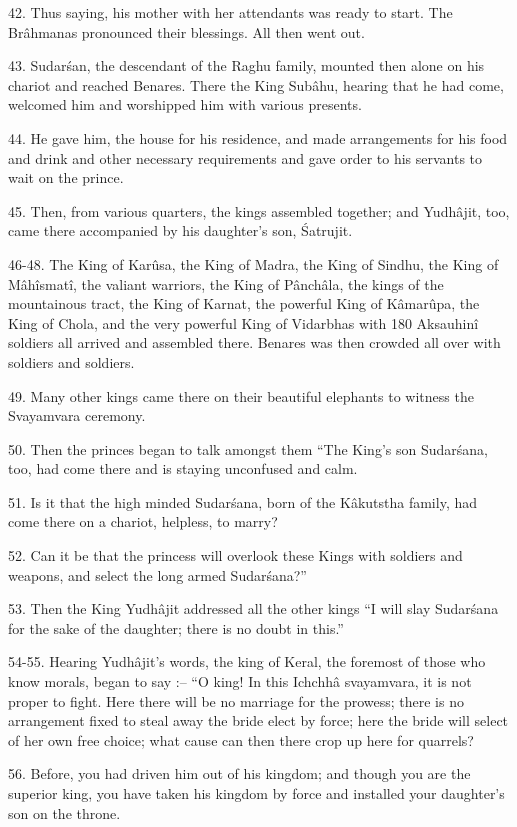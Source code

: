 42. Thus saying, his mother with her attendants was ready to start. The Br\^ahmanas pronounced their blessings. All then went out.

43. Sudar\'san, the descendant of the Raghu family, mounted then alone on his chariot and reached Benares. There the King Sub\^ahu, hearing that he had come, welcomed him and worshipped him with various presents.

44. He gave him, the house for his residence, and made arrangements for his food and drink and other necessary requirements and gave order to his servants to wait on the prince.

45. Then, from various quarters, the kings assembled together; and Yudh\^ajit, too, came there accompanied by his daughter's son, \'Satrujit.

46-48. The King of Karûsa, the King of Madra, the King of Sindhu, the King of M\^ah\^ismat\^i, the valiant warriors, the King of P\^anch\^ala, the kings of the mountainous tract, the King of Karnat, the powerful King of K\^amarûpa, the King of Chola, and the very powerful King of Vidarbhas with 180 Aksauhin\^i soldiers all arrived and assembled there. Benares was then crowded all over with soldiers and soldiers.

49. Many other kings came there on their beautiful elephants to witness the Svayamvara ceremony.

50. Then the princes began to talk amongst them ``The King's son Sudar\'sana, too, had come there and is staying unconfused and calm.

51. Is it that the high minded Sudar\'sana, born of the K\^akutstha family, had come there on a chariot, helpless, to marry?

52. Can it be that the princess will overlook these Kings with soldiers and weapons, and select the long armed Sudar\'sana?''

53. Then the King Yudh\^ajit addressed all the other kings ``I will slay Sudar\'sana for the sake of the daughter; there is no doubt in this.''

54-55. Hearing Yudh\^ajit's words, the king of Keral, the foremost of those who know morals, began to say :-- ``O king! In this Ichchh\^a svayamvara, it is not proper to fight. Here there will be no marriage for the prowess; there is no arrangement fixed to steal away the bride elect by force; here the bride will select of her own free choice; what cause can then there crop up here for quarrels?

56. Before, you had driven him out of his kingdom; and though you are the superior king, you have taken his kingdom by force and installed your daughter's son on the throne.

